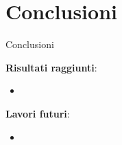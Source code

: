 
\section{Conclusioni}

\begin{frame}{Conclusioni}

    \textbf{Risultati raggiunti}:
    \begin{itemize}
        \item 
    \end{itemize}

    \vspace{3mm}

    \textbf{Lavori futuri}:
    \begin{itemize}
        \item 
    \end{itemize}
    
\end{frame}
